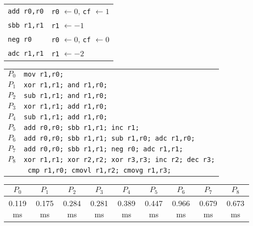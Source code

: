 \documentclass{beamer}
\renewcommand{\gets}{\leftarrow}
\begin{document}
\begin{frame}[containsverbatim]
\begin{table}
\tiny
\begin{tabular}{l|l}
\verb|add r0,r0|
& \verb|r0| $\gets 0$, \verb|cf| $\gets 1$ \\
\verb|sbb r1,r1|
& \verb|r1| $\gets -1$ \\
\verb|neg r0|
& \verb|r0| $\gets 0$, \verb|cf| $\gets 0$ \\
\verb|adc r1,r1|
& \verb|r1| $\gets -2$ \\
\end{tabular}
\end{table}
\end{frame}

\begin{frame}[containsverbatim]
\begin{table}
\tiny
\begin{tabular}{l|l}
$P_0$ & \verb|mov r1,r0;| \\
$P_1$ & \verb|xor r1,r1; and r1,r0;| \\
$P_2$ & \verb|sub r1,r1; and r1,r0;| \\
$P_3$ & \verb|xor r1,r1; add r1,r0;| \\
$P_4$ & \verb|sub r1,r1; add r1,r0;| \\
$P_5$ & \verb|add r0,r0; sbb r1,r1; inc r1;| \\
$P_6$ & \verb|add r0,r0; sbb r1,r1; sub r1,r0; adc r1,r0;| \\
$P_7$ & \verb|add r0,r0; sbb r1,r1; neg r0; adc r1,r1;| \\
$P_8$ & \verb|xor r1,r1; xor r2,r2; xor r3,r3; inc r2; dec r3;|\\
      & \verb| cmp r1,r0; cmovl r1,r2; cmovg r1,r3;| \\
\end{tabular}
\end{table}
\end{frame}

\begin{frame}
\begin{table}
\tiny
\setlength{\tabcolsep}{1mm}
\begin{tabular}{*{9}{c}}
$P_0$    & $P_1$    & $P_2$    & $P_3$    & $P_4$    & $P_5$    & $P_6$    & $P_7$    & $P_8$    \\
\hline
0.119 ms & 0.175 ms & 0.284 ms & 0.281 ms & 0.389 ms & 0.447 ms & 0.966 ms & 0.679 ms & 0.673 ms \\
\end{tabular}
\end{table}
\end{frame}
\end{document}
